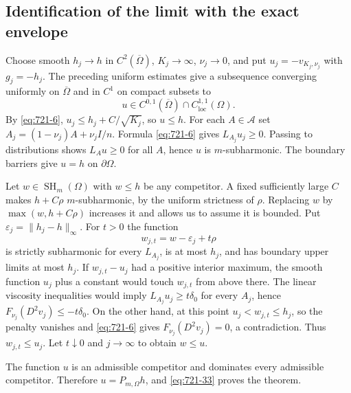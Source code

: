 \documentclass[11pt,a4paper]{article}
\theoremstyle{remark}
\begin{document}
\subsection{Identification of the limit with the exact envelope}

Choose smooth $h_j\to h$ in $C^2(\overline\Omega)$,
$K_j\to\infty$, $\nu_j\to0$, and put $u_j=-v_{K_j,\nu_j}$ with
$g_j=-h_j$.  The preceding uniform estimates give a subsequence converging
uniformly on $\overline\Omega$ and in $C^1$ on compact subsets to
\[
 u\in C^{0,1}(\overline\Omega)\cap C^{1,1}_{\mathrm{loc}}(\Omega).
\]
By \eqref{eq:721-6}, $u_j\le h_j+C/\sqrt{K_j}$, so $u\le h$.
For each $A\in\mathcal A$ set
$A_j=(1-\nu_j)A+\nu_jI/n$.  Formula \eqref{eq:721-6} gives $L_{A_j}u_j\ge0$.
Passing to distributions shows $L_Au\ge0$ for all $A$, hence $u$ is
$m$-subharmonic.  The boundary barriers give $u=h$ on $\partial\Omega$.

Let $w\in\operatorname{SH}_m(\Omega)$ with $w\le h$ be any competitor.
A fixed sufficiently large $C$ makes $h+C\rho$ $m$-subharmonic, by the
uniform strictness of $\rho$.  Replacing $w$ by
$\max(w,h+C\rho)$ increases it and allows us to assume it is bounded.
Put $\varepsilon_j=\|h_j-h\|_\infty$.  For $t>0$ the function
\[
 w_{j,t}=w-\varepsilon_j+t\rho
\]
is strictly subharmonic for every $L_{A_j}$, is at most $h_j$, and has
boundary upper limits at most $h_j$.  If $w_{j,t}-u_j$ had a positive
interior maximum, the smooth function $u_j$ plus a constant would touch
$w_{j,t}$ from above there.  The linear viscosity inequalities would imply
$L_{A_j}u_j\ge t\delta_0$ for every $A_j$, hence
$F_{\nu_j}(D^2v_j)\le-t\delta_0$.  On the other hand, at this point
$u_j<w_{j,t}\le h_j$, so the penalty vanishes and \eqref{eq:721-6} gives
$F_{\nu_j}(D^2v_j)=0$, a contradiction.  Thus $w_{j,t}\le u_j$.
Let $t\downarrow0$ and $j\to\infty$ to obtain $w\le u$.

The function $u$ is an admissible competitor and dominates every admissible
competitor.  Therefore $u=P_{m,\Omega}h$, and \eqref{eq:721-33} proves the theorem.
\end{document}
